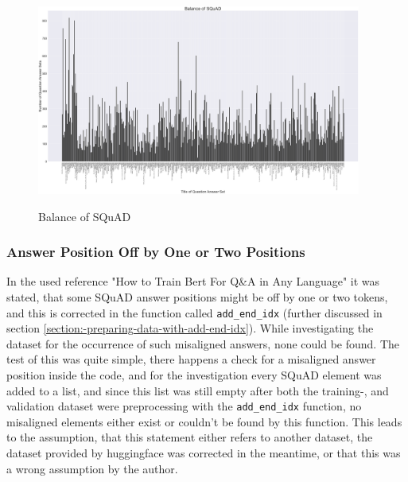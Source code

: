                 \begin{figure}[h!]
                    \centering
                    \caption{Balance of SQuAD}
                    \includegraphics[width=0.95\textwidth]{figures/balance_of_squad_dataset.png}
                    \label{fig:-data-properties---balance-of-data-barplot}
                \end{figure}


            \subsubsection{Answer Position Off by One or Two Positions}
            \label{subsubsection:-data-properties---incorrect-answer-positions}

                In the used reference "How to Train Bert For Q\&A in Any Language"\cite{bertTorwardsDataScience} it was stated, that 
                some SQuAD answer positions might be off by one or two tokens, and this is corrected in the function called \texttt{add\_end\_idx} (further discussed in section \ref{section:-preparing-data-with-add-end-idx}).
                While investigating the dataset for the occurrence of such misaligned answers, none could be found. 
                The test of this was quite simple, there happens a check for a misaligned answer position inside the code, and for the investigation every SQuAD element was added to a list, and since this list was still empty after both the training-, and validation dataset were preprocessing with the \texttt{add\_end\_idx} function, no misaligned elements either exist or couldn't be found by this function. 
                This leads to the assumption, that this statement either refers to another dataset, the dataset provided by huggingface was corrected in the meantime, or that this was a wrong assumption by the author.

